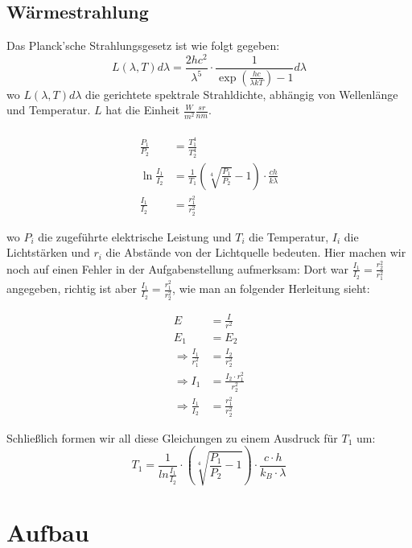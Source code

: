 \documentclass[12pt,a4paper,twopage]{article}
\begin{document}
\subsection{Wärmestrahlung}
Das Planck'sche Strahlungsgesetz ist wie folgt gegeben:
\begin{equation}
L(\lambda,T)d\lambda = \frac{2hc^2}{\lambda^5} \cdot \frac{1}{\exp\left(\frac{hc}{\lambda kT}\right) -1} d\lambda
\label{strahlungsgesetz}
\end{equation}
wo $L(\lambda,T)d\lambda$ die gerichtete spektrale Strahldichte, abhängig von Wellenlänge und Temperatur. $L$ hat die Einheit $\frac{W}{m^2}\frac{sr}{nm}$.\\
\\

\begin{align}
\label{waermetheorie}
\frac{P_1}{P_2}& = \frac{T_1^4}{T_2^4} \\
\ln \frac{I_1}{I_2} &= \frac{1}{T_1} \left(\sqrt[4]{\frac{P_1}{P_2}}-1\right) \cdot \frac{ch}{k\lambda} \\
\frac{I_1}{I_2} &= \frac{r_1^2}{r_2^2}
\label{waermeende}
\end{align}

wo $P_i$ die zugeführte elektrische Leistung und $T_i$ die Temperatur, 
$I_i$ die Lichtstärken und $r_i$ die Abstände von der Lichtquelle bedeuten.
Hier machen wir noch auf einen Fehler in der Aufgabenstellung aufmerksam: Dort war $\frac{I_1}{I_2} = \frac{r_2^2}{r_1^2}$ angegeben, richtig ist aber $\frac{I_1}{I_2} = \frac{r_1^2}{r_2^2}$, wie man an folgender Herleitung sieht:


\begin{align*}
E&=\frac{I}{r^2}\\
E_1&= E_ 2 \\
\Rightarrow \frac{I_1}{r_1^2}&= \frac{I_2}{r_2^2} \\
\Rightarrow I_1&= \frac{I_2 \cdot \textbf{$r_1^2$}}{r_2^2} \\
\Rightarrow \frac{I_1}{I_2}&= \frac{r_1^2}{r_2^2}
\end{align*}

Schließlich formen wir all diese Gleichungen zu einem Ausdruck für $T_1$ um:
\begin{equation}
T_1=\frac{1}{ln \frac{I_1}{I_2}}\cdot \left( \sqrt[4]{\frac{P_1}{P_2}-1} \right) \cdot \frac{c\cdot h}{k_B\cdot \lambda}
\end{equation} 
\section{Aufbau}
\end{document}
